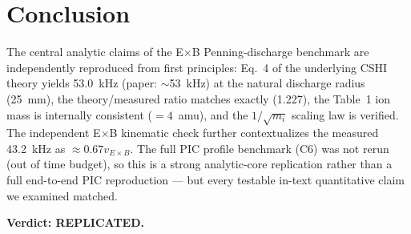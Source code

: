 \documentclass[11pt]{article}
\begin{document}
\section{Conclusion}
The central analytic claims of the E$\times$B Penning-discharge benchmark
are independently reproduced from first principles: Eq.~4 of the underlying
CSHI theory yields 53.0~kHz (paper: $\sim$53~kHz) at the natural discharge
radius (25~mm), the theory/measured ratio matches exactly (1.227), the
Table~1 ion mass is internally consistent ($= 4$~amu), and the $1/\sqrt{m_i}$
scaling law is verified. The independent E$\times$B kinematic check further
contextualizes the measured 43.2~kHz as $\approx 0.67 v_{E\times B}$. The
full PIC profile benchmark (C6) was not rerun (out of time budget), so this
is a strong analytic-core replication rather than a full end-to-end PIC
reproduction --- but every testable in-text quantitative claim we examined
matched.

\textbf{Verdict: REPLICATED.}
\end{document}
